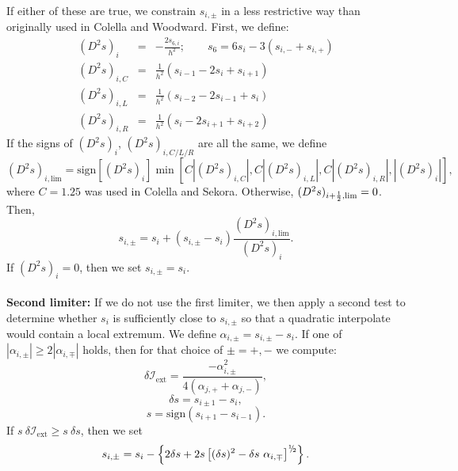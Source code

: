 \begin{itemize}
If either of these are true, we constrain $s_{i,\pm}$ in a less restrictive 
way than originally used in Colella and Woodward.  First, we define:
\begin{eqnarray}
(D^2s)_i &=& -\frac{2s_{6,i}}{h^2}; ~~~~~~~~~ s_6 = 6s_{i} - 3\left(s_{i,-}+s_{i,+}\right) \\
(D^2s)_{i,C} &=& \frac{1}{h^2}\left(s_{i-1}-2s_{i}+s_{i+1}\right) \\
(D^2s)_{i,L} &=& \frac{1}{h^2}\left(s_{i-2}-2s_{i-1}+s_{i}\right) \\
(D^2s)_{i,R} &=& \frac{1}{h^2}\left(s_{i}-2s_{i+1}+s_{i+2}\right)
\end{eqnarray}
If the signs of $(D^2s)_i$, $(D^2s)_{i,C/L/R}$ are all the
same, we define
\begin{equation}
(D^2s)_{i,\text{lim}} = \text{sign}\left[(D^2s)_{i}\right]\min\left[C|(D^2s)_{i,C}|,C|(D^2s)_{i,L}|,C|(D^2s)_{i,R}|,|(D^2s)_{i}|\right],
\end{equation}
where $C=1.25$ was used in Colella and Sekora.  Otherwise, 
$(D^2s)_{i+\frac{1}{2},\text{lim}}=0$.  Then,
\begin{equation}
s_{i,\pm} = s_i + \left(s_{i,\pm}-s_{i}\right)\frac{(D^2s)_{i,\text{lim}}}{(D^2s)_i}.
\end{equation}
If $(D^2s)_i=0$, then we set $s_{i,\pm} = s_i$.\\ \\
{\bf Second limiter:} If we do not use the first limiter, we then apply a 
second test to determine 
whether $s_i$ is sufficiently close to $s_{i,\pm}$ so that a quadratic 
interpolate would contain a local extremum.  We define 
$\alpha_{i,\pm} = s_{i,\pm} - s_i$.  If one of $|\alpha_{i,\pm}| \ge 2|\alpha_{i,\mp}|$
holds, then for that choice of $\pm = +,-$ we compute:
\begin{equation}
\delta\mathcal{I}_{\text{ext}} = \frac{-\alpha_{i,\pm}^2}{4\left(\alpha_{j,+}+\alpha_{j,-}\right)},
\end{equation}
\begin{equation}
\delta s = s_{i\pm 1} - s_i,
\end{equation}
\begin{equation}
s = \text{sign}\left(s_{i+1}-s_{i-1}\right).
\end{equation}
If $s ~ \delta\mathcal{I}_{\text{ext}} \ge s ~ \delta s$, then we set
\begin{equation}
s_{i,\pm} = s_i - \left\{2\delta s + 2s\left[(\delta s)^2 - \delta s ~  \alpha_{i,\mp}\right]^{\myhalf}\right\}.
\end{equation}

\end{itemize}
